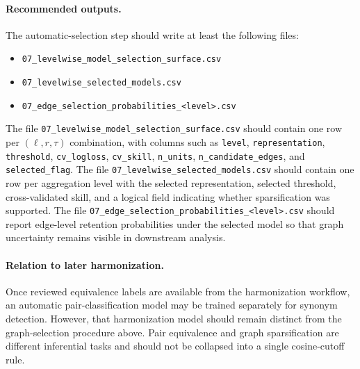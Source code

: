 \paragraph{Recommended outputs.}
The automatic-selection step should write at least the following files:
\begin{itemize}
    \item \texttt{07\_levelwise\_model\_selection\_surface.csv}
    \item \texttt{07\_levelwise\_selected\_models.csv}
    \item \texttt{07\_edge\_selection\_probabilities\_<level>.csv}
\end{itemize}
The file \texttt{07\_levelwise\_model\_selection\_surface.csv} should contain one row per
\((\ell,r,\tau)\) combination, with columns such as
\texttt{level}, \texttt{representation}, \texttt{threshold},
\texttt{cv\_logloss}, \texttt{cv\_skill}, \texttt{n\_units},
\texttt{n\_candidate\_edges}, and \texttt{selected\_flag}. The file
\texttt{07\_levelwise\_selected\_models.csv} should contain one row per aggregation level with
the selected representation, selected threshold, cross-validated skill, and a logical field
indicating whether sparsification was supported. The file
\texttt{07\_edge\_selection\_probabilities\_<level>.csv} should report edge-level retention
probabilities under the selected model so that graph uncertainty remains visible in downstream
analysis.

\paragraph{Relation to later harmonization.}
Once reviewed equivalence labels are available from the harmonization workflow, an automatic
pair-classification model may be trained separately for synonym detection. However, that
harmonization model should remain distinct from the graph-selection procedure above. Pair
equivalence and graph sparsification are different inferential tasks and should not be collapsed
into a single cosine-cutoff rule.